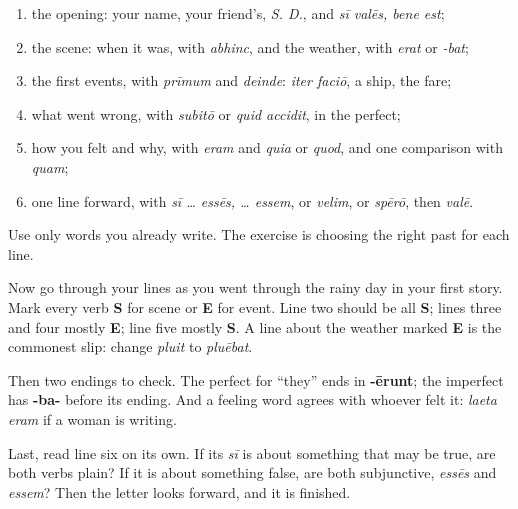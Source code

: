 \begin{enumerate}
\raggedright
  \item the opening: your name, your friend's, \emph{S. D.}, and \emph{sī valēs, bene est};
  \item the scene: when it was, with \emph{abhinc}, and the weather, with \emph{erat} or \emph{-bat};
  \item the first events, with \emph{prīmum} and \emph{deinde}: \emph{iter faciō}, a ship, the fare;
  \item what went wrong, with \emph{subitō} or \emph{quid accidit}, in the perfect;
  \item how you felt and why, with \emph{eram} and \emph{quia} or \emph{quod}, and one comparison with \emph{quam};
  \item one line forward, with \emph{sī … essēs, … essem}, or \emph{velim}, or \emph{spērō}, then \emph{valē}.
\end{enumerate}

Use only words you already write. The exercise is choosing the right past for each line.

\begin{tcolorbox}[breakable,colback=teal!4,colframe=teal!35!black,title={Before you move on}]
Now go through your lines as you went through the rainy day in your first story. Mark every verb \textbf{S} for scene or \textbf{E} for event. Line two should be all \textbf{S}; lines three and four mostly \textbf{E}; line five mostly \textbf{S}. A line about the weather marked \textbf{E} is the commonest slip: change \emph{pluit} to \emph{pluēbat}.

Then two endings to check. The perfect for \textquotedblleft{}they\textquotedblright{} ends in \textbf{-ērunt}; the imperfect has \textbf{-ba-} before its ending. And a feeling word agrees with whoever felt it: \emph{laeta eram} if a woman is writing.

Last, read line six on its own. If its \emph{sī} is about something that may be true, are both verbs plain? If it is about something false, are both subjunctive, \emph{essēs} and \emph{essem}? Then the letter looks forward, and it is finished.
\end{tcolorbox}
